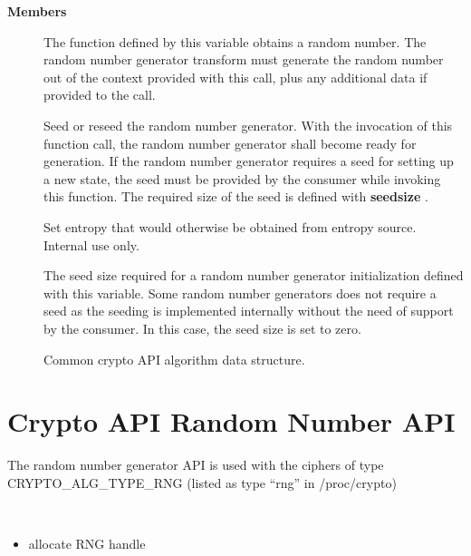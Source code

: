 \documentclass[a4paper,8pt,english]{sphinxmanual}
\begin{document}
\textbf{Members}
\begin{description}
\item[{}] \leavevmode
The function defined by this variable obtains a
random number. The random number generator transform
must generate the random number out of the context
provided with this call, plus any additional data
if provided to the call.

\item[{}] \leavevmode
Seed or reseed the random number generator.  With the
invocation of this function call, the random number
generator shall become ready for generation.  If the
random number generator requires a seed for setting
up a new state, the seed must be provided by the
consumer while invoking this function. The required
size of the seed is defined with \textbf{seedsize} .

\item[{}] \leavevmode
Set entropy that would otherwise be obtained from
entropy source.  Internal use only.

\item[{}] \leavevmode
The seed size required for a random number generator
initialization defined with this variable. Some
random number generators does not require a seed
as the seeding is implemented internally without
the need of support by the consumer. In this case,
the seed size is set to zero.

\item[{}] \leavevmode
Common crypto API algorithm data structure.

\end{description}


\section{Crypto API Random Number API}
\label{crypto/api-rng:crypto-api-random-number-api}
The random number generator API is used with the ciphers of type
CRYPTO\_ALG\_TYPE\_RNG (listed as type ``rng'' in /proc/crypto)

\begin{fulllineitems}
\label{crypto/api-rng:c.crypto_alloc_rng}~\begin{itemize}
\item {} 
allocate RNG handle

\end{itemize}

\end{fulllineitems}
\end{document}

